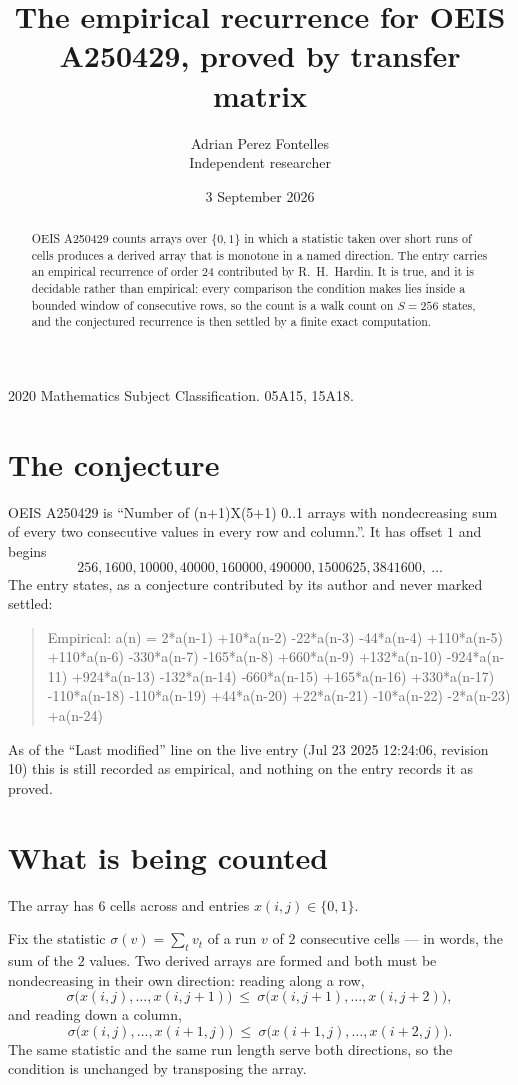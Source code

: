 \documentclass[11pt,a4paper]{article}
\title{The empirical recurrence for OEIS A250429, proved by transfer matrix}
\author{Adrian Perez Fontelles\\ \small Independent researcher}
\date{3 September 2026}
\theoremstyle{plain}
\theoremstyle{definition}
\begin{document}
\maketitle

\begin{abstract}
OEIS A250429 counts arrays over $\{0,1\}$ in which a statistic taken over short runs
of cells produces a derived array that is monotone in a named direction. The entry carries an
empirical recurrence of order $24$ contributed by R.~H.~Hardin. It is true, and it is
decidable rather than empirical: every comparison the condition makes lies inside a bounded
window of consecutive rows, so the count is a walk count on $S=256$ states, and the
conjectured recurrence is then settled by a finite exact computation.
\end{abstract}

\noindent\small 2020 Mathematics Subject Classification. 05A15, 15A18.\normalsize

\section{The conjecture}

OEIS A250429 is ``Number of (n+1)X(5+1) 0..1 arrays with nondecreasing sum of every two consecutive values in every row and column.''. It has offset $1$ and begins
\[
256, 1600, 10000, 40000, 160000, 490000, 1500625, 3841600,\ \dots
\]
The entry states, as a conjecture contributed by its author and never marked settled:
\begin{quote}
Empirical: a(n) = 2*a(n-1) +10*a(n-2) -22*a(n-3) -44*a(n-4) +110*a(n-5) +110*a(n-6) -330*a(n-7) -165*a(n-8) +660*a(n-9) +132*a(n-10) -924*a(n-11) +924*a(n-13) -132*a(n-14) -660*a(n-15) +165*a(n-16) +330*a(n-17) -110*a(n-18) -110*a(n-19) +44*a(n-20) +22*a(n-21) -10*a(n-22) -2*a(n-23) +a(n-24)
\end{quote}
As of the ``Last modified'' line on the live entry (Jul 23 2025 12:24:06, revision 10) this is still
recorded as empirical, and nothing on the entry records it as proved.

\section{What is being counted}

The array has $6$ cells across and entries $x(i,j)\in\{0,1\}$.

Fix the statistic $\sigma(v)=\sum_{t} v_t$ of a run $v$ of $2$ consecutive cells --- in words,
the sum of the $2$ values. Two derived arrays are formed and both must be
nondecreasing in their own direction: reading along a row,
\[
\sigma\bigl(x(i,j),\dots,x(i,j{+}1)\bigr)\ \le\
\sigma\bigl(x(i,j{+}1),\dots,x(i,j{+}2)\bigr),
\]
and reading down a column,
\[
\sigma\bigl(x(i,j),\dots,x(i{+}1,j)\bigr)\ \le\
\sigma\bigl(x(i{+}1,j),\dots,x(i{+}2,j)\bigr).
\]
The same statistic and the same run length serve both directions, so the condition is
unchanged by transposing the array.
\end{document}
